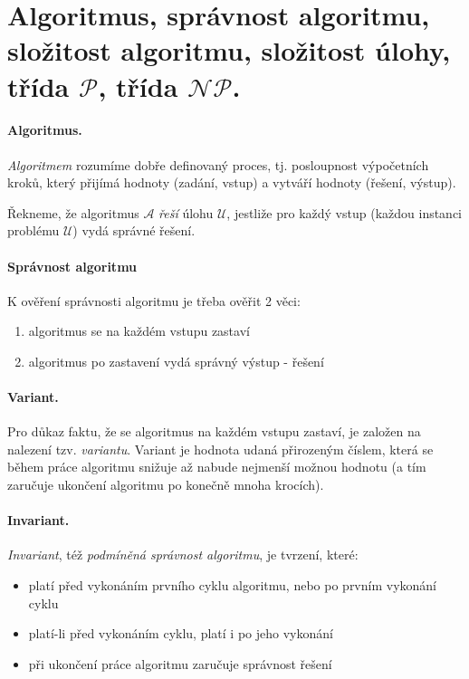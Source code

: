 \section[TAL - Algoritmus, $\mathcal{P}$, $\mathcal{NP}$]{Algoritmus, správnost algoritmu, složitost algoritmu, složitost úlohy, třída $\mathcal{P}$, třída $\mathcal{NP}$.}

\paragraph{Algoritmus.}
\label{algoritmus}
\textit{Algoritmem} rozumíme dobře definovaný proces, tj. posloupnost výpočetních kroků, který přijímá hodnoty (zadání, vstup) a vytváří hodnoty (řešení, výstup).

Řekneme, že algoritmus $\mathcal{A}$ \textit{řeší}  úlohu $\mathcal{U}$, jestliže pro každý vstup (každou instanci problému $\mathcal{U}$) vydá správné řešení.

\paragraph{Správnost algoritmu}
K ověření správnosti algoritmu je třeba ověřit 2 věci:
\begin{enumerate}[itemsep=0pt]
    \item algoritmus se na každém vstupu zastaví
    \item algoritmus po zastavení vydá správný výstup - řešení
\end{enumerate}

\paragraph{Variant.}
Pro důkaz faktu, že se algoritmus na každém vstupu zastaví, je založen na nalezení tzv. \textit{variantu}. Variant je hodnota udaná přirozeným číslem, která se během práce algoritmu snižuje až nabude nejmenší možnou hodnotu (a tím zaručuje ukončení algoritmu po konečně mnoha krocích).

\paragraph{Invariant.}
\textit{Invariant}, též \textit{podmíněná správnost algoritmu}, je tvrzení, které:
\begin{itemize}[itemsep=0pt]
    \item platí před vykonáním prvního cyklu algoritmu, nebo po prvním vykonání cyklu
    \item platí-li před vykonáním cyklu, platí i po jeho vykonání
    \item při ukončení práce algoritmu zaručuje správnost řešení
\end{itemize}

